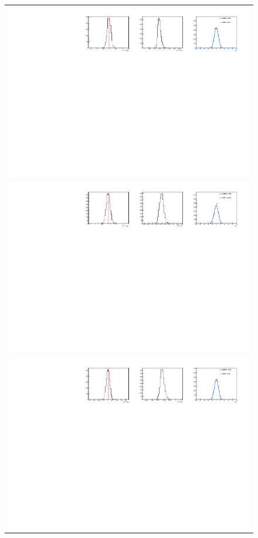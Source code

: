 \begin{figure}
  \centering
  \begin{tabular}{c}
\includegraphics[width=\textwidth]{ANA_resources/Plots/Data_fit/FitterBias//A_signal_KK_run1.pdf} \\
\includegraphics[width=\textwidth]{ANA_resources/Plots/Data_fit/FitterBias//R_signal_KK_run1.pdf} \\
\includegraphics[width=\textwidth]{ANA_resources/Plots/Data_fit/FitterBias//A_Bs_KK_run1.pdf} \\

\end{tabular}
\end{figure}

